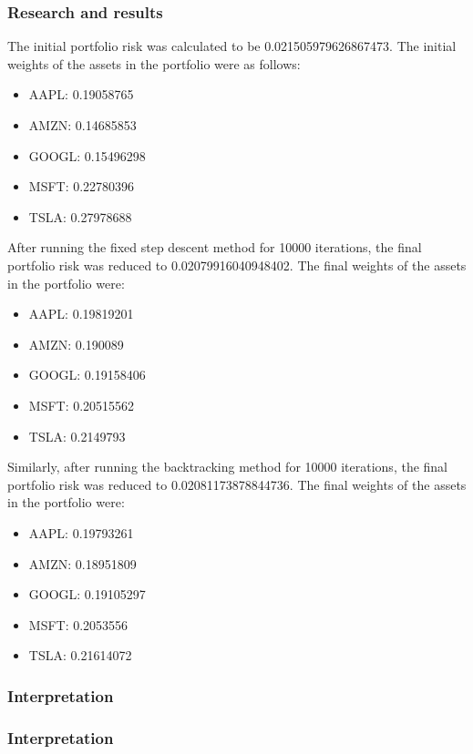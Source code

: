 \documentclass[12pt]{article}
\begin{document}
\subsubsection*{Research and results}

The initial portfolio risk was calculated to be 0.021505979626867473. The initial weights of the assets in the portfolio were as follows:

\begin{itemize}
    \item AAPL: 0.19058765
    \item AMZN: 0.14685853
    \item GOOGL: 0.15496298
    \item MSFT: 0.22780396
    \item TSLA: 0.27978688
\end{itemize}

After running the fixed step descent method for 10000 iterations, the final portfolio risk was reduced to 0.02079916040948402. The final weights of the assets in the portfolio were:

\begin{itemize}
    \item AAPL: 0.19819201
    \item AMZN: 0.190089
    \item GOOGL: 0.19158406
    \item MSFT: 0.20515562
    \item TSLA: 0.2149793
\end{itemize}

Similarly, after running the backtracking method for 10000 iterations, the final portfolio risk was reduced to 0.02081173878844736. The final weights of the assets in the portfolio were:

\begin{itemize}
    \item AAPL: 0.19793261
    \item AMZN: 0.18951809
    \item GOOGL: 0.19105297
    \item MSFT: 0.2053556
    \item TSLA: 0.21614072
\end{itemize}

\subsubsection*{Interpretation}


\subsubsection*{Interpretation}
\end{document}
